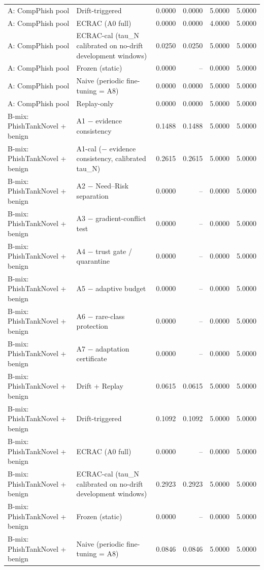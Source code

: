 \begin{table}[t]
\begin{tabular}{llrrrr}
A: CompPhish pool & Drift-triggered & 0.0000 & 0.0000 & 5.0000 & 5.0000 \\
A: CompPhish pool & ECRAC (A0 full) & 0.0000 & 0.0000 & 4.0000 & 5.0000 \\
A: CompPhish pool & ECRAC-cal (tau\_N calibrated on no-drift development windows) & 0.0250 & 0.0250 & 5.0000 & 5.0000 \\
A: CompPhish pool & Frozen (static) & 0.0000 & -- & 0.0000 & 5.0000 \\
A: CompPhish pool & Naive (periodic fine-tuning = A8) & 0.0000 & 0.0000 & 5.0000 & 5.0000 \\
A: CompPhish pool & Replay-only & 0.0000 & 0.0000 & 5.0000 & 5.0000 \\
B-mix: PhishTankNovel + benign & A1 − evidence consistency & 0.1488 & 0.1488 & 5.0000 & 5.0000 \\
B-mix: PhishTankNovel + benign & A1-cal (− evidence consistency, calibrated tau\_N) & 0.2615 & 0.2615 & 5.0000 & 5.0000 \\
B-mix: PhishTankNovel + benign & A2 − Need–Risk separation & 0.0000 & -- & 0.0000 & 5.0000 \\
B-mix: PhishTankNovel + benign & A3 − gradient-conflict test & 0.0000 & -- & 0.0000 & 5.0000 \\
B-mix: PhishTankNovel + benign & A4 − trust gate / quarantine & 0.0000 & -- & 0.0000 & 5.0000 \\
B-mix: PhishTankNovel + benign & A5 − adaptive budget & 0.0000 & -- & 0.0000 & 5.0000 \\
B-mix: PhishTankNovel + benign & A6 − rare-class protection & 0.0000 & -- & 0.0000 & 5.0000 \\
B-mix: PhishTankNovel + benign & A7 − adaptation certificate & 0.0000 & -- & 0.0000 & 5.0000 \\
B-mix: PhishTankNovel + benign & Drift + Replay & 0.0615 & 0.0615 & 5.0000 & 5.0000 \\
B-mix: PhishTankNovel + benign & Drift-triggered & 0.1092 & 0.1092 & 5.0000 & 5.0000 \\
B-mix: PhishTankNovel + benign & ECRAC (A0 full) & 0.0000 & -- & 0.0000 & 5.0000 \\
B-mix: PhishTankNovel + benign & ECRAC-cal (tau\_N calibrated on no-drift development windows) & 0.2923 & 0.2923 & 5.0000 & 5.0000 \\
B-mix: PhishTankNovel + benign & Frozen (static) & 0.0000 & -- & 0.0000 & 5.0000 \\
B-mix: PhishTankNovel + benign & Naive (periodic fine-tuning = A8) & 0.0846 & 0.0846 & 5.0000 & 5.0000 \\

\end{tabular}
\end{table}
